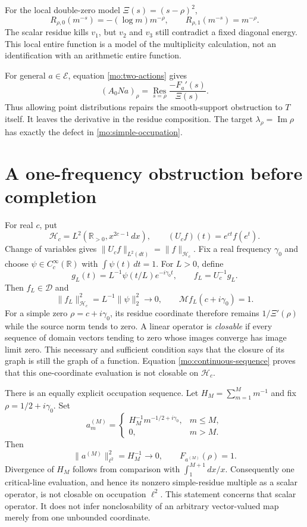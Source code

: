 For the local double-zero model $\Xi(s)=(s-\rho)^2$,
\[
 R_{\rho,0}(m^{-s})=-(\log m)m^{-\rho},\qquad
 R_{\rho,1}(m^{-s})=m^{-\rho}.
\]
The scalar residue kills $v_1$, but $v_2$ and $v_3$ still contradict
a fixed diagonal energy. This local entire function is a model
of the multiplicity calculation, not an identification with an
arithmetic entire function.

For general $a\in\mathscr E$, equation \eqref{mo:two-actions} gives
\[
 (A_0Na)_\rho=\operatorname*{Res}_{s=\rho}
                      \frac{-F_a'(s)}{\Xi(s)}.
\]
Thus allowing point distributions repairs the smooth-support
obstruction to $T$ itself. It leaves the derivative in the residue
composition. The target $\lambda_\rho=\operatorname{Im}\rho$ has
exactly the defect in \eqref{mo:simple-occupation}.

\section{A one-frequency obstruction before completion}

For real $c$, put
\[
 \mathscr H_c=L^2(\mathbb R_{>0},x^{2c-1}\,dx),\qquad
 (U_cf)(t)=e^{ct}f(e^t).
\]
Change of variables gives $\|U_cf\|_{L^2(dt)}=\|f\|_{\mathscr H_c}$.
Fix a real frequency $\gamma_0$ and choose
$\psi\in C_c^\infty(\mathbb R)$ with $\int\psi(t)\,dt=1$.
For $L>0$, define
\[
 g_L(t)=L^{-1}\psi(t/L)e^{-i\gamma_0t},\qquad f_L=U_c^{-1}g_L.
\]
Then $f_L\in\mathscr D$ and
\begin{equation}
 \|f_L\|_{\mathscr H_c}^2=L^{-1}\|\psi\|_2^2\longrightarrow0,
 \qquad \mathcal Mf_L(c+i\gamma_0)=1.
 \label{mo:continuous-sequence}
\end{equation}
For a simple zero $\rho=c+i\gamma_0$, its residue coordinate
therefore remains $1/\Xi'(\rho)$ while the source norm tends to zero.
A linear operator is \emph{closable} if every sequence of domain
vectors tending to zero whose images converge has image limit zero.
This necessary and sufficient condition says that the closure of
its graph is still the graph of a function. Equation
\eqref{mo:continuous-sequence} proves that this one-coordinate
evaluation is not closable on $\mathscr H_c$.

There is an equally explicit occupation sequence. Let
$H_M=\sum_{m=1}^M m^{-1}$ and fix $\rho=1/2+i\gamma_0$. Set
\[
 a_m^{(M)}=
 \begin{cases}H_M^{-1}m^{-1/2+i\gamma_0},&m\leq M,\\0,&m>M.
 \end{cases}
\]
Then
\begin{equation}
 \|a^{(M)}\|_{\ell^2}^2=H_M^{-1}\longrightarrow0,
 \qquad F_{a^{(M)}}(\rho)=1.
 \label{mo:atomic-sequence}
\end{equation}
Divergence of $H_M$ follows from comparison with $\int_1^{M+1}dx/x$.
Consequently one critical-line evaluation, and hence its nonzero
simple-residue multiple as a scalar operator, is not closable on
occupation $\ell^2$. This statement concerns that scalar operator.
It does not infer nonclosability of an arbitrary vector-valued
map merely from one unbounded coordinate.

